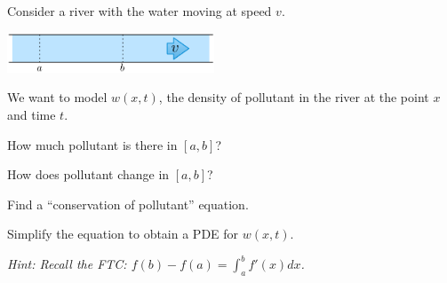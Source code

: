 \documentclass{workbook}
\begin{document}
\begin{slide}
\question \label{transport}

\begin{problem}
	
Consider a river with the water moving at speed $v$.
\begin{center}
\includegraphics*[width=175pt]{images/river.pdf}
\end{center}

We want to model $w(x,t)$, the density of pollutant in the river at the point $x$ and time $t$.
\end{problem}

\begin{parts}
\item How much pollutant is there in $[a,b]$?
\item How does pollutant change in $[a,b]$?
\item Find a ``conservation of pollutant'' equation.
\item Simplify the equation to obtain a PDE for $w(x,t)$.

\textit{Hint: Recall the FTC: $f(b)-f(a) = \int_a^b f'(x) dx$.}

\end{parts}


\end{slide}
\end{document}
